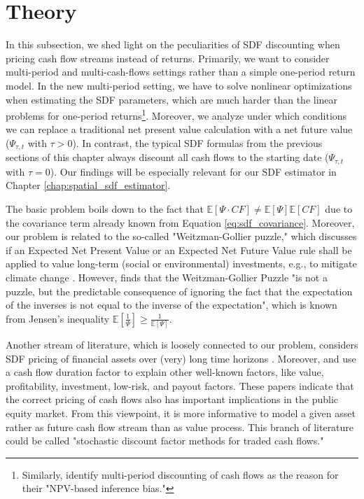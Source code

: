
\section{Theory}
\label{sec:sdf_estimation_cash_flows}

In this subsection, we shed light on the peculiarities of SDF discounting when pricing cash flow streams instead of returns.
Primarily, we want to consider multi-period and multi-cash-flows settings rather than a simple one-period return model.
In the new multi-period setting, we have to solve nonlinear optimizations when estimating the SDF parameters, which are much harder than the linear problems for one-period returns\footnote{Similarly, \cite{GSW19} identify multi-period discounting of cash flows as the reason for their "NPV-based inference bias."}.
Moreover, we analyze under which conditions we can replace a traditional net present value calculation with a net future value ($\Psi_{\tau,t}$ with $\tau>0$).
In contrast, the typical SDF formulas from the previous sections of this chapter always discount all cash flows to the starting date ($\Psi_{\tau,t}$ with $\tau=0$).
Our findings will be especially relevant for our SDF estimator in Chapter \ref{chap:spatial_sdf_estimator}.

The basic problem boils down to the fact that $\mathbb{E} \left[ \Psi \cdot CF \right] \neq \mathbb{E} \left[ \Psi \right] \mathbb{E} \left[ CF \right]$ due to the covariance term already known from Equation \ref{eq:sdf_covariance}.
Moreover, our problem is related to the so-called "Weitzman-Gollier puzzle," which discusses if an Expected Net Present Value or an Expected Net Future Value rule shall be applied to value long-term (social or environmental) investments, e.g., to mitigate climate change \citep{PR75,GW10,F10}. 
However, \cite{S20b} finds that the Weitzman-Gollier Puzzle "is not a puzzle, but the predictable consequence of ignoring the fact that the expectation of the inverses is not equal to the inverse of the expectation", which is known from Jensen's inequality $\mathbb{E} \left[ \frac{1}{\Psi} \right] \geq \frac{1}{\mathbb{E} \left[ \Psi \right]}$.

Another stream of literature, which is loosely connected to our problem, considers SDF pricing of financial assets over (very) long time horizons \citep{V02,CV04,HHL08,HS09,P09,M12}.
Moreover, \cite{G21} and \cite{GL21} use a cash flow duration factor to explain other well-known factors, like value, profitability, investment, low-risk, and payout factors. 
These papers indicate that the correct pricing of cash flows also has important implications in the public equity market.
From this viewpoint, it is more informative to model a given asset rather as future cash flow stream than as value process.
This branch of literature could be called "stochastic discount factor methods for traded cash flows."



